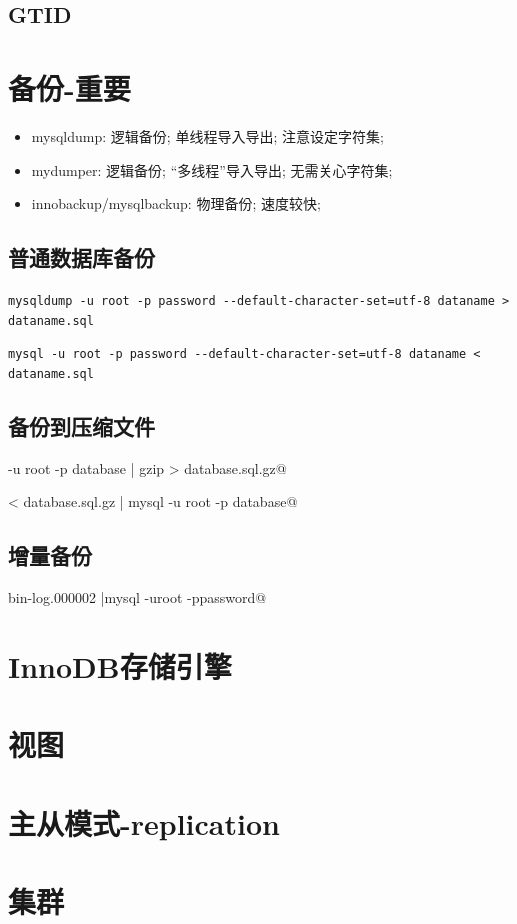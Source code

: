 \documentclass[UTF8,a4paper,12pt]{ctexbook}
\begin{document}
		\subsection{GTID}
		
	\section{备份-重要}
		\begin{itemize}
			\item mysqldump: 逻辑备份; 单线程导入导出; 注意设定字符集; 
			\item mydumper: 逻辑备份; “多线程”导入导出; 无需关心字符集;
			\item innobackup/mysqlbackup: 物理备份; 速度较快;
		\end{itemize}
		\subsection{普通数据库备份}
			\verb|mysqldump -u root -p password --default-character-set=utf-8 dataname > dataname.sql|
			
			\verb|mysql -u root -p password --default-character-set=utf-8 dataname < dataname.sql|
		\subsection{备份到压缩文件}
			\verb@mysqldump -u root -p database | gzip > database.sql.gz@
			
			\verb@gzip < database.sql.gz | mysql -u root -p database@
		\subsection{增量备份}
			\verb@mysqlbinlog bin-log.000002 |mysql -uroot -ppassword@
		
	\section{InnoDB存储引擎}
	
	\section{视图}

	\section{主从模式-replication}
	
	\section{集群}
\end{document}
